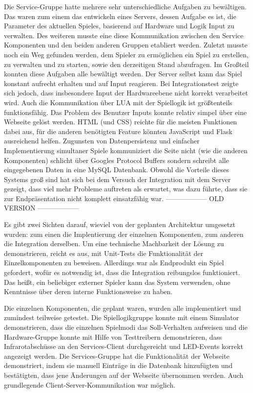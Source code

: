 Die Service-Gruppe hatte mehrere sehr unterschiedliche Aufgaben zu bewältigen. Das waren zum einem das entwickeln eines Servers,
dessen Aufgabe es ist, die Parameter des aktuellen Spieles, basierend auf Hardware und Logik Input zu verwalten.
Des weiteren musste eine diese Kommunikation zwischen den Service Komponenten und den beiden anderen Gruppen etabliert werden. 
Zuletzt musste noch ein Weg gefunden werden, dem Spieler zu ermöglichen ein Spiel zu erstellen, zu verwalten und zu starten, sowie den derzeitigen Stand abzufragen.
Im Großteil konnten diese Aufgaben alle bewältigt werden. Der Server selbst kann das Spiel konstant aufrecht erhalten und auf 
Input reagieren. Bei Integrationstest zeigte sich jedoch, dass insbesondere Input der Hardwareebene nicht korrekt verarbeitet wird. 
Auch die Kommunikation über LUA mit der Spiellogik ist größtenteils funktionsfähig.
Das Problem des Benutzer Inputs konnte relativ simpel über eine Webseite gelöst werden. 
HTML (und CSS) reichte für die meisten Funktionen dabei aus, für die anderen benötigten Feature könnten JavaScript und 
Flask ausreichend helfen. Zugunsten von Datenpersistenz und einfacher Implementierung simultaner Spiele kommuniziert die Seite 
nicht (wie die anderen Komponenten) schlicht über Googles Protocol Buffers sondern schreibt alle eingegebenen Daten in eine MySQL Datenbank.
Obwohl die Vorteile dieses Systems groß sind hat sich bei dem Versuch der Integration mit dem Server gezeigt, dass viel mehr Probleme 
auftreten als erwartet, was dazu führte, dass sie zur Endpräsentation nicht komplett einsatzfähig war.
------------------ OLD VERSION ------------------



Es gibt zwei Sichten darauf, wieviel von der geplanten Architektur umgesetzt wurden: zum einen die
Implentierung der einzelnen Komponenten, zum anderen die Integration derselben.
Um eine technische Machbarkeit der Lösung zu demonstrieren, reicht es aus, mit Unit-Tests die
Funktionalität der Einzelkomponenten zu beweisen.
Allerdings war als Endprodukt ein Spiel gefordert, wofür es notwendig ist, dass die Integration
reibungslos funktioniert.
Das heißt, ein beliebiger externer Spieler kann das System verwenden, ohne Kenntnisse über deren
interne Funktionsweise zu haben.

Die einzelnen Komponenten, die geplant waren, wurden alle implementiert und zumindest teilweise
getestet.
Die Spiellogikgruppe konnte mit einem Simulator demonstrieren, dass die einzelnen Spielmodi das
Soll-Verhalten aufweisen und die Hardware-Gruppe konnte mit Hilfe von Testtreibern demonstrieren,
dass Infrarotabschüsse an den Services-Client durchgereicht und LED-Events korrekt angezeigt werden.
Die Services-Gruppe hat die Funktionalität der Webseite demonstriert, indem sie manuell Einträge in
die Datenbank hinzufügten und bestätigten, dass jene Änderungen auf der Webseite übernommen werden.
Auch grundlegende Client-Server-Kommunikation war möglich.

